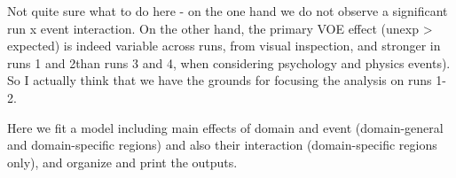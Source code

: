\documentclass[
]{article}
\newenvironment{Shaded}{\begin{snugshade}}{\end{snugshade}}
\newcommand{\FunctionTok}[1]{\textcolor[rgb]{0.00,0.00,0.00}{#1}}
\newcommand{\NormalTok}[1]{#1}
\newcommand{\OtherTok}[1]{\textcolor[rgb]{0.56,0.35,0.01}{#1}}
\newcommand{\SpecialCharTok}[1]{\textcolor[rgb]{0.00,0.00,0.00}{#1}}
\newcommand{\StringTok}[1]{\textcolor[rgb]{0.31,0.60,0.02}{#1}}
\begin{document}
Not quite sure what to do here - on the one hand we do not observe a
significant run x event interaction. On the other hand, the primary VOE
effect (unexp \textgreater{} expected) is indeed variable across runs,
from visual inspection, and stronger in runs 1 and 2than runs 3 and 4,
when considering psychology and physics events). So I actually think
that we have the grounds for focusing the analysis on runs 1-2.

Here we fit a model including main effects of domain and event
(domain-general and domain-specific regions) and also their interaction
(domain-specific regions only), and organize and print the outputs.

\begin{Shaded}
\end{Shaded}
\end{document}
